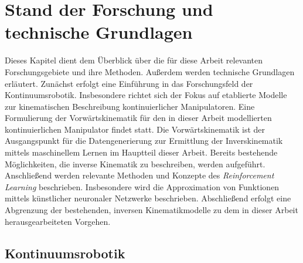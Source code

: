 \chapter{Stand der Forschung und technische Grundlagen}
\label{ch:stand_der_forschung}
Dieses Kapitel dient dem Überblick über die für diese Arbeit relevanten Forschungsgebiete und ihre Methoden. Außerdem werden technische Grundlagen erläutert. Zunächst erfolgt eine Einführung in das Forschungsfeld der Kontinuumsrobotik. Insbesondere richtet sich der Fokus auf etablierte Modelle zur kinematischen Beschreibung kontinuierlicher Manipulatoren. Eine Formulierung der Vorwärtskinematik für den in dieser Arbeit modellierten kontinuierlichen Manipulator findet statt. Die Vorwärtskinematik ist der Ausgangspunkt für die Datengenerierung zur Ermittlung der Inverskinematik mittels maschinellem Lernen im Hauptteil dieser Arbeit. Bereits bestehende Möglichkeiten, die inverse Kinematik zu beschreiben, werden aufgeführt.
Anschließend werden relevante Methoden und Konzepte des \textit{Reinforcement Learning} beschrieben. Insbesondere wird die Approximation von Funktionen mittels künstlicher neuronaler Netzwerke beschrieben. Abschließend erfolgt eine Abgrenzung der bestehenden, inversen Kinematikmodelle zu dem in dieser Arbeit herausgearbeiteten Vorgehen. 



\section{Kontinuumsrobotik}
\label{sec:kontinuumsrobotik}

